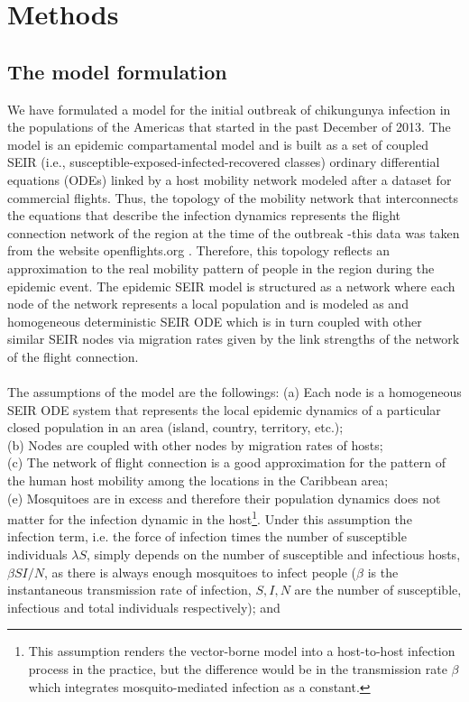 \documentclass[10pt,a4paper]{article}
\begin{document}
\section*{Methods}
\subsection*{The model formulation}
We have formulated a model for the initial outbreak of chikungunya infection in the populations of the Americas that started in the past December of 2013. 
%
The model is an epidemic compartamental model and is built as a set of coupled SEIR (i.e., susceptible-exposed-infected-recovered classes) ordinary differential equations (ODEs) linked by a host mobility network modeled after a dataset for commercial flights. 
%
Thus, the topology of the mobility network that interconnects the equations that describe the infection dynamics represents the flight connection network of the region at the time of the outbreak -this data was taken from the website openflights.org \citep{openflights}. Therefore, this topology reflects an approximation to the real mobility pattern of people in the region during the epidemic event. 
%
The epidemic SEIR model is structured as a network where each node of the network represents a local population and is modeled as and homogeneous deterministic SEIR ODE which is in turn coupled with other similar SEIR nodes via migration rates given by the link strengths  of the network of the flight connection. 
\\\\
The assumptions of the model are the followings:
(a) Each node is a homogeneous SEIR ODE system that represents the local epidemic dynamics of a particular closed population in an area (island, country, territory, etc.);\\
(b) Nodes are coupled with other nodes by migration rates of hosts;\\
(c) The network of flight connection is a good approximation for the pattern of the human host mobility among the locations in the Caribbean area;\\
(e) Mosquitoes are in excess and therefore their population dynamics does not matter for the infection dynamic in the host\footnote{This assumption renders the vector-borne model into a host-to-host infection process in the practice, but the difference would be in the transmission rate $\beta$ which integrates mosquito-mediated infection as a constant.}. Under this assumption the infection term, i.e. the force of infection times the number of susceptible individuals $\lambda S$, simply depends on the number of susceptible and infectious hosts, $\beta SI/N$, as there is always enough mosquitoes to infect people ($\beta$ is the instantaneous transmission rate of infection, $S,I,N$ are the number of susceptible, infectious and total individuals respectively); and \\
\end{document}
